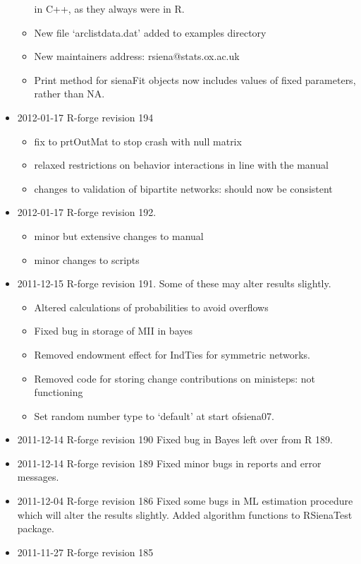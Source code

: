 \documentclass[a4paper,fleqn,11pt]{article}
\newcommand{\+}{\, + \,}
\begin{document}
\begin{small}
\begin{itemize}
\begin{itemize}
    in C++, as they always were in R.
\item New file `arclistdata.dat' added to examples directory
\item New maintainers address: rsiena@stats.ox.ac.uk
\item Print method for sienaFit objects now includes values of fixed parameters,
  rather than NA.
\end{itemize}
\item 2012-01-17 R-forge revision 194
\begin{itemize}
\item fix to prtOutMat to stop crash with null matrix
\item relaxed restrictions on behavior interactions in line with the manual
\item changes to validation of bipartite networks: should now be consistent
\end{itemize}
\item 2012-01-17 R-forge revision 192.
\begin{itemize}
\item minor but extensive changes to manual
\item minor changes to scripts
\end{itemize}
\item 2011-12-15 R-forge revision 191. Some of these may alter results slightly.
\begin{itemize}
\item Altered calculations of probabilities to avoid overflows
\item Fixed bug in storage of MII in bayes
\item Removed endowment effect for IndTies for symmetric networks.
\item Removed code for storing change contributions on ministeps: not
  functioning
\item Set random number type to `default' at start of\textsf{siena07}.
\end{itemize}
\item 2011-12-14 R-forge revision 190
Fixed bug in Bayes left over from R 189.
\item 2011-12-14 R-forge revision 189
 Fixed minor bugs in reports and error messages.
\item 2011-12-04 R-forge revision 186
Fixed some bugs in ML estimation procedure which will alter the results
slightly. Added algorithm functions to \textsf{RSienaTest} package.
\item 2011-11-27 R-forge revision 185
\begin{itemize}

\end{itemize}
\end{itemize}
\end{small}
\end{document}
